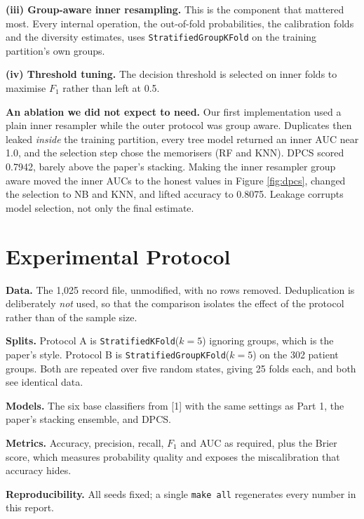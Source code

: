 \documentclass[11pt,a4paper]{article}
\newenvironment{keypoint}{\begin{leftbar}\small}{\end{leftbar}}
\begin{document}
\textbf{(iii) Group-aware inner resampling.} This is the component that mattered
most. Every internal operation, the out-of-fold probabilities, the calibration
folds and the diversity estimates, uses \texttt{StratifiedGroupKFold} on the
training partition's own groups.

\textbf{(iv) Threshold tuning.} The decision threshold is selected on inner folds
to maximise $F_1$ rather than left at 0.5.

\begin{keypoint}
\textbf{An ablation we did not expect to need.} Our first implementation used a
plain inner resampler while the outer protocol was group aware. Duplicates then
leaked \emph{inside} the training partition, every tree model returned an inner
AUC near 1.0, and the selection step chose the memorisers (RF and KNN). DPCS
scored 0.7942, barely above the paper's stacking. Making the inner resampler
group aware moved the inner AUCs to the honest values in
Figure \ref{fig:dpcs}, changed the selection to NB and KNN, and lifted accuracy
to 0.8075. Leakage corrupts model selection, not only the final estimate.
\end{keypoint}

\section{Experimental Protocol}\label{sec:protocol2}

\textbf{Data.} The 1{,}025 record file, unmodified, with no rows removed.
Deduplication is deliberately \emph{not} used, so that the comparison isolates the
effect of the protocol rather than of the sample size.

\textbf{Splits.} Protocol A is \texttt{StratifiedKFold}($k=5$) ignoring groups,
which is the paper's style. Protocol B is \texttt{StratifiedGroupKFold}($k=5$)
on the 302 patient groups. Both are repeated over five random states, giving 25
folds each, and both see identical data.

\textbf{Models.} The six base classifiers from [1] with the same
settings as Part 1, the paper's stacking ensemble, and DPCS.

\textbf{Metrics.} Accuracy, precision, recall, $F_1$ and AUC as required, plus the
Brier score, which measures probability quality and exposes the miscalibration
that accuracy hides.

\textbf{Reproducibility.} All seeds fixed; a single \texttt{make all} regenerates
every number in this report.
\end{document}
